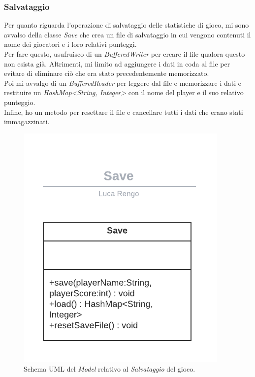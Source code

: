 
\subsubsection*{Salvataggio}

\textsf{\small Per quanto riguarda l'operazione di salvataggio delle statistiche di gioco, mi sono avvalso della classe \emph{Save} che crea un file di salvataggio in cui vengono contenuti il nome dei giocatori e i loro relativi punteggi.}\\

\textsf{\small Per fare questo, usufruisco di un \emph{BufferedWriter} per creare il file qualora questo non esista già. Altrimenti, mi limito ad aggiungere i dati in coda al file per evitare di eliminare ciò che era stato precedentemente memorizzato.}\\

\textsf{\small Poi mi avvalgo di un \emph{BufferedReader} per leggere dal file e memorizzare i dati e restituire un \emph{HashMap<String, Integer>} con il nome del player e il suo relativo punteggio.}\\

\textsf{\small Infine, ho un metodo per resettare il file e cancellare tutti i dati che erano stati immagazzinati.}\\

\begin{figure}[H]
	\centering{}
	\includegraphics[width=.5\textwidth]{./img/save_uml.png} 
	\caption{Schema UML del \emph{Model} relativo al \emph{Salvataggio} del gioco.}
	\label{img:save_uml}
\end{figure}